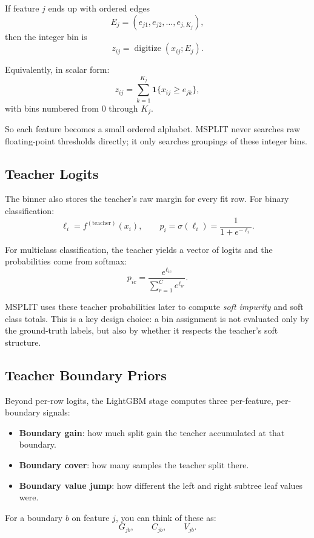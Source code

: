 \documentclass[11pt]{article}
\begin{document}
If feature \(j\) ends up with ordered edges
\[
E_j = (e_{j1}, e_{j2}, \dots, e_{j,K_j}),
\]
then the integer bin is
\[
z_{ij} = \operatorname{digitize}(x_{ij}; E_j).
\]

Equivalently, in scalar form:
\[
z_{ij} = \sum_{k=1}^{K_j} \mathbf{1}\{x_{ij} \ge e_{jk}\},
\]
with bins numbered from \(0\) through \(K_j\).

So each feature becomes a small ordered alphabet. MSPLIT never searches raw floating-point thresholds directly; it only searches groupings of these integer bins.

\subsection{Teacher Logits}

The binner also stores the teacher's raw margin for every fit row. For binary classification:
\[
\ell_i = f^{(\mathrm{teacher})}(x_i), \qquad
p_i = \sigma(\ell_i) = \frac{1}{1 + e^{-\ell_i}}.
\]

For multiclass classification, the teacher yields a vector of logits and the probabilities come from softmax:
\[
p_{ic} = \frac{e^{\ell_{ic}}}{\sum_{r=1}^{C} e^{\ell_{ir}}}.
\]

MSPLIT uses these teacher probabilities later to compute \emph{soft impurity} and soft class totals. This is a key design choice: a bin assignment is not evaluated only by the ground-truth labels, but also by whether it respects the teacher's soft structure.

\subsection{Teacher Boundary Priors}

Beyond per-row logits, the LightGBM stage computes three per-feature, per-boundary signals:

\begin{itemize}
\item \textbf{Boundary gain}: how much split gain the teacher accumulated at that boundary.
\item \textbf{Boundary cover}: how many samples the teacher split there.
\item \textbf{Boundary value jump}: how different the left and right subtree leaf values were.
\end{itemize}

For a boundary \(b\) on feature \(j\), you can think of these as:
\[
G_{jb}, \qquad C_{jb}, \qquad V_{jb}.
\]
\end{document}
